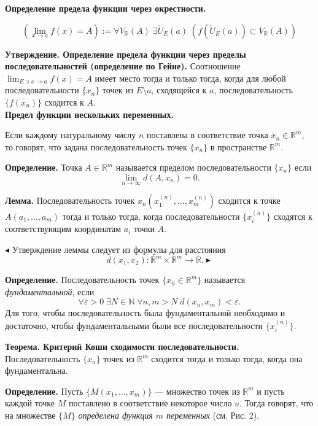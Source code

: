 \documentclass[12pt]{article}
\begin{document}
\textbf{Определение предела функции через окрестности.}

$$
\left( \lim_{x\rightarrow a}f(x) = A \right) := 
\forall V_{\mathbb{R}}(A) \; \exists \mathring{U}_E(a) \; \left( f(\mathring{U}_E(a)) \subset V_{\mathbb{R}}(A)  \right)
$$


\textbf{Утверждение. Определение предела функции через пределы последовательностей (определение по Гейне).} Соотношение $\lim_{E \ni x \rightarrow a} f(x) = A$ имеет место тогда и только тогда, когда для любой последовательности $\{ x_n \}$ точек из $E \setminus a$, сходящейся к $a$, последовательность $\{ f(x_n) \}$ сходится к $A$. \\



\textbf{Предел функции нескольких переменных.}


Если каждому натуральному числу $n$ поставлена в соответствие точка $x_n \in \mathbb{R}^m$, то говорят, что задана последовательность точек $\{ x_n\}$ в пространстве $\mathbb{R}^m$.

 
\textbf{Определение.} Точка $A \in \mathbb{R}^m$ называется пределом последовательности $\{ x_n \}$ если 
$$
\lim_{n \rightarrow \infty} d(A, x_n) = 0.
$$

\textbf{Лемма.} Последовательность точек $x_n(x_1^{(n)}, ..., x_m^{(n)})$ сходится к точке $A(a_1,...,a_m)$ тогда и только тогда, когда последовательности $\{ x_i^{(n)}\}$ сходятся к соответствующим координатам $a_i$ точки $A$. 

$\blacktriangleleft$
Утверждение леммы следует из формулы для расстояния $$d(x_1,x_2): \mathbb{R}^m \times \mathbb{R}^m \rightarrow \mathbb{R}.\blacktriangleright$$


\textbf{Определение.} Последовательность точек $\{ x_n \in \mathbb{R}^m \}$ называется \textit{фундаментальной}, если
$$
	\forall \varepsilon > 0 \; \exists N \in \mathbb{N} \; \forall n,m > N \; d(x_n, x_m) < \varepsilon.
$$
Для того, чтобы последовательность была фундаментальной необходимо и достаточно, чтобы фундаментальными были все последовательности $\{ x_i^{(n)}\}$.

\textbf{Теорема. Критерий Коши сходимости последовательности.} Последовательность $\{ x_n \} $ точек из $\mathbb{R}^m$ сходится тогда и только тогда, когда она фундаментальна.

\textbf{Определение.} Пусть $ \{ M (x_1,..., x_m)\}$ --- множество точек из $\mathbb{R}^m$ и пусть каждой точке $M$ поставлено в соответствие некоторое число $u$. Тогда говорят, что на множестве $\{ M \}$ \textit{определена функция $m$ переменных} (см. Рис. 2).
\end{document}
